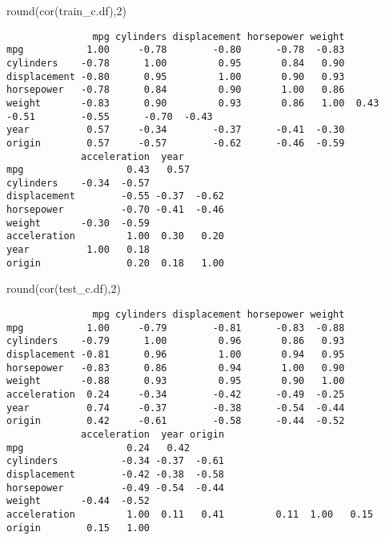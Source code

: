 \documentclass[
]{article}
\newenvironment{Shaded}{\begin{snugshade}}{\end{snugshade}}
\newcommand{\DecValTok}[1]{\textcolor[rgb]{0.00,0.00,0.81}{#1}}
\newcommand{\FunctionTok}[1]{\textcolor[rgb]{0.00,0.00,0.00}{#1}}
\newcommand{\NormalTok}[1]{#1}
\begin{document}
\begin{Shaded}
\begin{Highlighting}[]
\FunctionTok{round}\NormalTok{(}\FunctionTok{cor}\NormalTok{(train\_c.df),}\DecValTok{2}\NormalTok{)}
\end{Highlighting}
\end{Shaded}

\begin{verbatim}
               mpg cylinders displacement horsepower weight
mpg           1.00     -0.78        -0.80      -0.78  -0.83
cylinders    -0.78      1.00         0.95       0.84   0.90
displacement -0.80      0.95         1.00       0.90   0.93
horsepower   -0.78      0.84         0.90       1.00   0.86
weight       -0.83      0.90         0.93       0.86   1.00  0.43     -0.51        -0.55      -0.70  -0.43
year          0.57     -0.34        -0.37      -0.41  -0.30
origin        0.57     -0.57        -0.62      -0.46  -0.59
             acceleration  year
mpg                  0.43   0.57
cylinders    -0.34  -0.57
displacement        -0.55 -0.37  -0.62
horsepower          -0.70 -0.41  -0.46
weight       -0.30  -0.59
acceleration         1.00  0.30   0.20
year          1.00   0.18
origin               0.20  0.18   1.00
\end{verbatim}

\begin{Shaded}
\begin{Highlighting}[]
\FunctionTok{round}\NormalTok{(}\FunctionTok{cor}\NormalTok{(test\_c.df),}\DecValTok{2}\NormalTok{)}
\end{Highlighting}
\end{Shaded}

\begin{verbatim}
               mpg cylinders displacement horsepower weight
mpg           1.00     -0.79        -0.81      -0.83  -0.88
cylinders    -0.79      1.00         0.96       0.86   0.93
displacement -0.81      0.96         1.00       0.94   0.95
horsepower   -0.83      0.86         0.94       1.00   0.90
weight       -0.88      0.93         0.95       0.90   1.00
acceleration  0.24     -0.34        -0.42      -0.49  -0.25
year          0.74     -0.37        -0.38      -0.54  -0.44
origin        0.42     -0.61        -0.58      -0.44  -0.52
             acceleration  year origin
mpg                  0.24   0.42
cylinders           -0.34 -0.37  -0.61
displacement        -0.42 -0.38  -0.58
horsepower          -0.49 -0.54  -0.44
weight       -0.44  -0.52
acceleration         1.00  0.11   0.41         0.11  1.00   0.15
origin        0.15   1.00
\end{verbatim}
\end{document}
